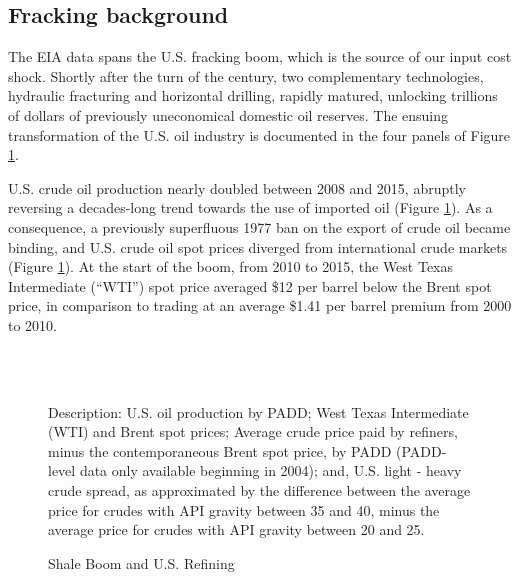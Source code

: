 \documentclass[12pt]{article}
\newcommand{\figpath}{../output/offline/figures}
\begin{document}
\subsection{Fracking background \label{sec:Fracking}}

The EIA data spans the U.S. fracking boom, which is the source of our input cost shock. Shortly after the turn of the century, two complementary technologies, hydraulic fracturing and horizontal drilling, rapidly matured, unlocking trillions of dollars of previously uneconomical domestic oil reserves. The ensuing transformation of the U.S. oil industry is documented in the four panels of Figure \ref{fig4}.

U.S. crude oil production nearly doubled between 2008 and 2015, abruptly reversing a decades-long trend towards the use of imported oil (Figure \ref{fig4}\hspace{-1pt}).  As a consequence, a previously superfluous 1977 ban on the export of crude oil became binding, and U.S. crude oil spot prices diverged from international crude markets (Figure \ref{fig4}\hspace{-1pt}). At the start of the boom, from 2010 to 2015, the West Texas Intermediate (``WTI'') spot price averaged \$12 per barrel below the Brent spot price, in comparison to trading at an average \$1.41 per barrel premium from 2000 to 2010.

\begin{figure}%
  \centering
  \caption{Shale Boom and U.S. Refining \label{fig4}}
  \hspace{5pt}%
  \\
  \hspace{5pt}%
   \\
  \begin{minipage}{.9\linewidth} \doublespacing
  Description:  U.S. oil production by PADD;
   West Texas Intermediate (WTI) and Brent spot prices;
   Average crude price paid by refiners, minus the contemporaneous Brent spot price, by PADD (PADD-level data only available beginning in 2004); and,
   U.S. light - heavy crude spread, as approximated by the difference between the average price for crudes with API gravity between 35 and 40, minus the average price for crudes with API gravity between 20 and 25.
  \end{minipage}
\end{figure}
\end{document}
